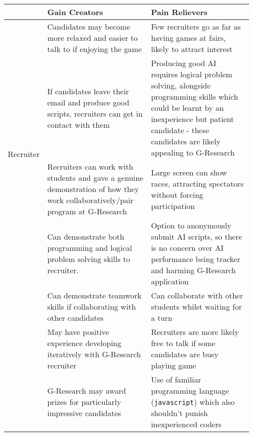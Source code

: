 \begin{tabularx}{\textwidth}{| c | X | X |}
	\hline
	& Gain Creators & Pain Relievers \\ 
	\hline\hline
	\multirow{4}{*}{Recruiter} 
		       & Candidates may become more relaxed and easier to talk to if enjoying the game
		       & Few recruiters go as far as having games at fairs, likely to attract interest \\ \cline{2-3}

		       & If candidates leave their email and produce good scripts, recruiters can get in contact with them
		       & Producing good AI requires logical problem solving, alongside programming skills which could be learnt by an inexperience but patient candidate - these candidates are likely appealing to G-Research\\ \cline{2-3}
	
		       & Recruiters can work with students and gave a genuine demonstration of how they work collaboratively/pair program at G-Research
		       & Large screen can show races, attracting spectators without forcing participation\\ 
	\hline\hline
\multirow{4}{*}{Student} 
		       & Can demonstrate both programming and logical problem solving skills to recruiter.
		       & Option to anonymously submit AI scripts, so there is no concern over AI performance being tracker and harming G-Research application\\ \cline{2-3}

		       & Can demonstrate teamwork skills if collaborating with other candidates
		       & Can collaborate with other students whilst waiting for a turn\\ \cline{2-3}

		       & May have positive experience developing iteratively with G-Research recruiter
		       & Recruiters are more likely free to talk if some candidates are busy playing game\\ \cline{2-3}
		       
		       & G-Research may award prizes for particularly impressive candidates
		       & Use of familiar programming language ({\tt javascript}) which also shouldn't punish inexperienced coders\\ 
	\hline
\end{tabularx}

